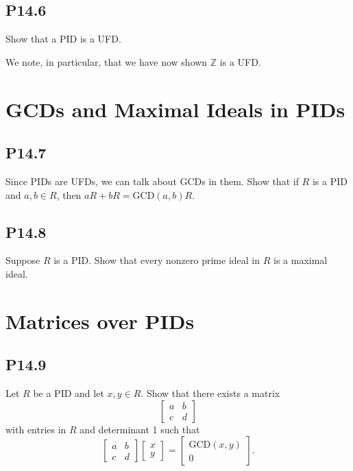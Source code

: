 \documentclass[lang=cn,11pt]{template}
\begin{document}
\subsection*{P14.6} Show that a PID is a UFD.

\begin{remark}
We note, in particular, that we have now shown \( \mathbb{Z} \) is a UFD.
\end{remark}

\section{GCDs and Maximal Ideals in PIDs}

\subsection*{P14.7} Since PIDs are UFDs, we can talk about GCDs in them. Show that if \( R \) is a PID and \( a, b \in R \), then \( aR + bR = \text{GCD}(a, b)R \).

\subsection*{P14.8} Suppose \( R \) is a PID. Show that every nonzero prime ideal in \( R \) is a maximal ideal.

\section{Matrices over PIDs}

\subsection*{P14.9} Let \( R \) be a PID and let \( x, y \in R \). Show that there exists a matrix
\[
\begin{bmatrix} a & b \\ c & d \end{bmatrix}
\]
with entries in \( R \) and determinant 1 such that
\[
\begin{bmatrix} a & b \\ c & d \end{bmatrix} \begin{bmatrix} x \\ y \end{bmatrix} = \begin{bmatrix} \text{GCD}(x, y) \\ 0 \end{bmatrix}.
\]
\end{document}
